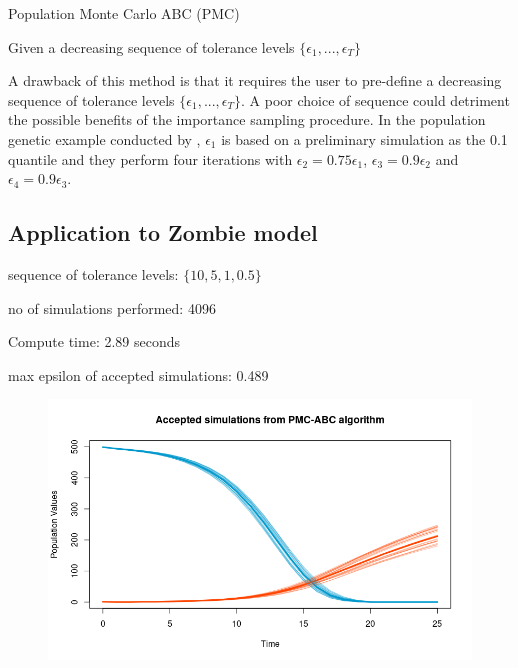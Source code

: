 \documentclass[]{article}
\begin{document}
\begin{algorithm}[H]
	\label{PMC ABC}
	\caption{Population Monte Carlo ABC (PMC)}
	Given a decreasing sequence of tolerance levels $\{\epsilon_1, ..., \epsilon_T\}$\;
\end{algorithm}	

A drawback of this method is that it requires the user to pre-define a decreasing sequence of tolerance levels $\{\epsilon_1, ..., \epsilon_T\}$. A poor choice of sequence could detriment the possible benefits of the importance sampling procedure. In the population genetic example conducted by \cite{RN21}, $\epsilon_1$ is based on a preliminary simulation as the 0.1 quantile and they perform four iterations with $\epsilon_2 = 0.75\epsilon_1$, $\epsilon_3 = 0.9\epsilon_2$ and $\epsilon_4 = 0.9\epsilon_3$.

\subsection{Application to Zombie model}

sequence of tolerance levels: $\{ 10, 5, 1, 0.5\}$

no of simulations performed: 4096

Compute time: 2.89 seconds

max epsilon of accepted simulations: 0.489

\begin{figure}[H]
	\centering
	\includegraphics[width=0.8\linewidth]{../Figures/PMC-ABC_simulations}
\end{figure}
\end{document}
